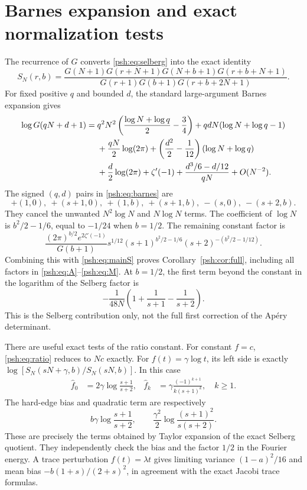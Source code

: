 \documentclass[11pt,a4paper]{article}
\numberwithin{equation}{section}
\theoremstyle{remark}\newtheorem{remark}[theorem]{Remark}
\newcommand{\fh}{\widehat f}
\begin{document}
\section{Barnes expansion and exact normalization tests}\label{psh:sec:barnes}
The recurrence of $G$ converts \eqref{psh:eq:selberg} into the exact identity
\begin{equation}\label{psh:eq:barnes}
 S_N(r,b)=
 \frac{G(N+1)G(r+N+1)G(N+b+1)G(r+b+N+1)}
      {G(r+1)G(b+1)G(r+b+2N+1)}.
\end{equation}
For fixed positive $q$ and bounded $d$, the standard large-argument
Barnes expansion gives
\begin{align}
 \log G(qN+d+1)={}&q^2N^2\left(\frac{\log N+\log q}{2}-\frac34\right)
    +qdN(\log N+\log q-1)\notag\\
 &+\frac{qN}{2}\log(2\pi)
    +\left(\frac{d^2}{2}-\frac1{12}\right)(\log N+\log q)
       \notag\\
 &+\frac d2\log(2\pi)+\zeta'(-1)
    +\frac{d^3/6-d/12}{qN}+O(N^{-2}).\label{psh:eq:Barnesexp}
\end{align}
The signed $(q,d)$ pairs in \eqref{psh:eq:barnes} are
\[
 +(1,0),\ +(s+1,0),\ +(1,b),\ +(s+1,b),\ -(s,0),\ -(s+2,b).
\]
They cancel the unwanted $N^2\log N$ and $N\log N$ terms. The
coefficient of $\log N$ is $b^2/2-1/6$, equal to $-1/24$ when $b=1/2$.
The remaining constant factor is
\begin{equation}\label{psh:eq:generalconst}
 \frac{(2\pi)^{b/2}e^{2\zeta'(-1)}}{G(b+1)}
 s^{1/12}(s+1)^{b^2/2-1/6}(s+2)^{-(b^2/2-1/12)}.
\end{equation}
Combining this with \eqref{psh:eq:mainS} proves Corollary~\ref{psh:cor:full},
including all factors in \eqref{psh:eq:A}--\eqref{psh:eq:M}.
At $b=1/2$, the first term beyond the constant in the logarithm of the
Selberg factor is
\begin{equation}\label{psh:eq:Selbergc1}
 -\frac1{48N}\left(1+\frac1{s+1}-\frac1{s+2}\right).
\end{equation}
This is the Selberg contribution only, not the full first correction of
the Ap\'ery determinant.

There are useful exact tests of the ratio constant. For constant $f=c$,
\eqref{psh:eq:ratio} reduces to $Nc$ exactly. For
$f(t)=\gamma\log t$, its left side is exactly
$\log[S_N(sN+\gamma,b)/S_N(sN,b)]$. In this case
\begin{align*}
 \fh_0&=2\gamma\log\frac{s+1}{s+2},
 &\fh_k&=\gamma\frac{(-1)^{k+1}}{k(s+1)^k},\quad k\geq1.
\end{align*}
The hard-edge bias and quadratic term are respectively
\[
 b\gamma\log\frac{s+1}{s+2},\qquad
 \frac{\gamma^2}{2}\log\frac{(s+1)^2}{s(s+2)}.
\]
These are precisely the terms obtained by Taylor expansion of the exact
Selberg quotient. They independently check the bias and the factor
$1/2$ in the Fourier energy. A trace perturbation $f(t)=\lambda t$
gives limiting variance $(1-a)^2/16$ and mean bias
$-b(1+s)/(2+s)^2$, in agreement with the exact Jacobi trace formulas.
\end{document}
